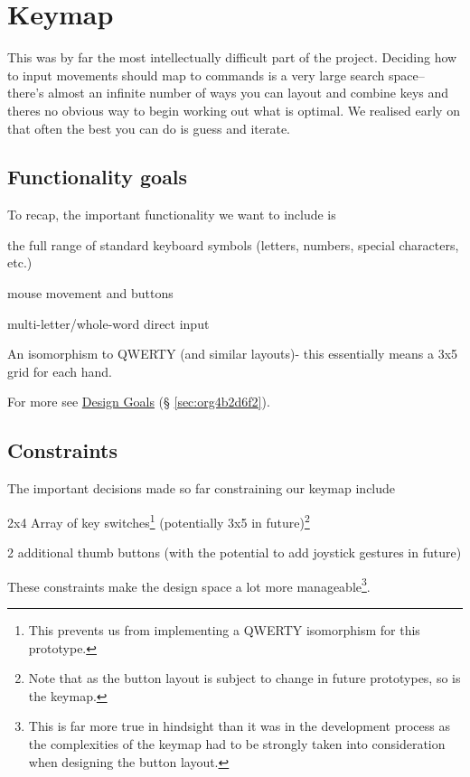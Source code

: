 \documentclass[logo,bsc,singlespacing,parskip]{infthesis}
\begin{document}
\section{Keymap}
\label{sec:org944e559}
This was by far the most intellectually difficult part of the project.
Deciding how to input movements should map to commands is a very large search space-- there's almost an infinite number of ways you can layout and combine keys and theres no obvious way to begin working out what is optimal.
We realised early on that often the best you can do is guess and iterate.

\subsection{Functionality goals}
\label{sec:org5f59c64}
To recap, the important functionality we want to include is
\begin{enumerate*}[label={\arabic*)}, itemjoin={, \,}, itemjoin*={, and \,}]
\item the full range of standard keyboard symbols (letters, numbers, special characters, etc.)
\item mouse movement and buttons
\item multi-letter/whole-word direct input
\item An isomorphism to QWERTY (and similar layouts)- this essentially means a 3x5 grid for each hand.
\end{enumerate*}
For more see \hyperref[sec:org4b2d6f2]{Design Goals} (§ \ref{sec:org4b2d6f2}).

\subsection{Constraints}
\label{sec:org2fdffd6}
The important decisions made so far constraining our keymap include
\begin{enumerate*}[label={\arabic*)}, itemjoin={, \,}, itemjoin*={, and \,}]
\item 2x4 Array of key switches\footnote{This prevents us from implementing a QWERTY isomorphism for this prototype.} (potentially 3x5 in future)\footnote{Note that as the button layout is subject to change in future prototypes, so is the keymap.}
\item 2 additional thumb buttons (with the potential to add joystick gestures in future)
\end{enumerate*}
These constraints make the design space a lot more manageable\footnote{This is far more true in hindsight than it was in the development process as the complexities of the keymap had to be strongly taken into consideration when designing the button layout.}.
\end{document}
